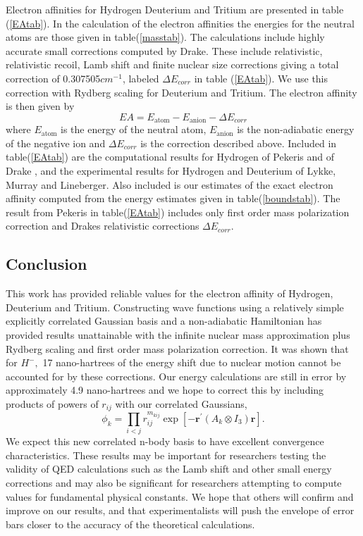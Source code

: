 \documentclass[12pt,thmsa]{article}
\begin{document}
Electron affinities for Hydrogen Deuterium and Tritium are presented in
table (\ref{EAtab}). In the calculation of the electron affinities the
energies for the neutral atoms are those given in table(\ref{masstab}). The
calculations include highly accurate small corrections computed by Drake\cite
{Drake88}. These include relativistic, relativistic recoil, Lamb shift and
finite nuclear size corrections giving a total correction of 0.307505$%
cm^{-1} $, labeled $\Delta E_{corr}$ in table (\ref{EAtab}). We use this
correction with Rydberg scaling for Deuterium and Tritium. The electron
affinity is then given by 
\begin{equation}
EA=E_{\text{atom}}-E_{\text{anion}}-\Delta E_{corr}
\end{equation}
where $E_{\text{atom}}$ is the energy of the neutral atom, $E_{\text{anion}}$
is the non-adiabatic energy of the negative ion and $\Delta E_{corr}$ is the
correction described above. Included in table(\ref{EAtab}) are the
computational results for Hydrogen of Pekeris\cite{Pekeris62} and of Drake%
\cite{Drake88}, and the experimental results for Hydrogen and Deuterium of
Lykke, Murray and Lineberger\cite{Lykke91}. Also included is our estimates
of the exact electron affinity computed from the energy estimates given in
table(\ref{boundstab}). The result from Pekeris in table(\ref{EAtab})
includes only first order mass polarization correction and Drakes
relativistic corrections $\Delta E_{corr}.$

\subsection{Conclusion}

This work has provided reliable values for the electron affinity of
Hydrogen, Deuterium and Tritium. Constructing wave functions using a
relatively simple explicitly correlated Gaussian basis and a non-adiabatic
Hamiltonian has provided results unattainable with the infinite nuclear mass
approximation plus Rydberg scaling and first order mass polarization
correction. It was shown that for $H^{-},$ 17 nano-hartrees of the energy
shift due to nuclear motion cannot be accounted for by these corrections.
Our energy calculations are still in error by approximately 4.9
nano-hartrees and we hope to correct this by including products of powers of 
$r_{ij}$ with our correlated Gaussians, 
\begin{equation}
\phi _k=\prod_{i<j}r_{ij}^{m_{kij}}\exp \left[ -\mathbf{r}^{\prime
}(A_k\otimes I_3)\mathbf{r}\right] .
\end{equation}
We expect this new correlated n-body basis to have excellent convergence
characteristics. These results may be important for researchers testing the
validity of QED calculations such as the Lamb shift and other small energy
corrections and may also be significant for researchers attempting to
compute values for fundamental physical constants. We hope that others will
confirm and improve on our results, and that experimentalists will push the
envelope of error bars closer to the accuracy of the theoretical
calculations.
\end{document}
